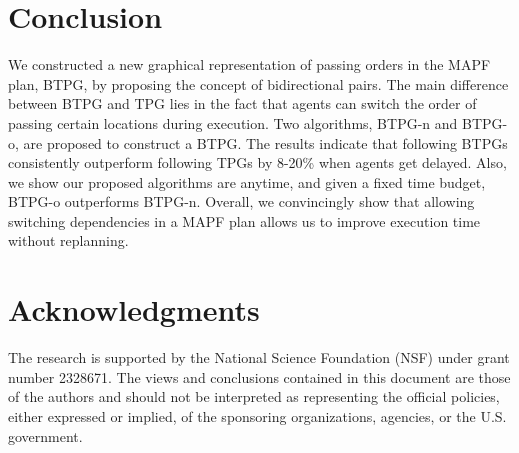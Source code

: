 \documentclass[letterpaper]{article} %
\theoremstyle{definition}
\begin{document}


\section{Conclusion}
We constructed a new graphical representation of passing orders in the MAPF plan, BTPG, by proposing the concept of bidirectional pairs. The main difference between BTPG and TPG lies in the fact that agents can switch the order of passing certain locations during execution. Two algorithms, BTPG-n and BTPG-o, are proposed to construct a BTPG. The results indicate that following BTPGs consistently outperform following TPGs by 8-20\% when agents get delayed. Also, we show our proposed algorithms are anytime, and given a fixed time budget, BTPG-o outperforms BTPG-n. Overall, we convincingly show that allowing switching dependencies in a MAPF plan allows us to improve execution time without replanning.

\section*{Acknowledgments}
The research is supported by the National Science Foundation (NSF) under grant number 2328671. The views and conclusions contained in this document are those of the authors and should not be interpreted as representing the official policies, either expressed or implied, of the sponsoring organizations, agencies, or the U.S. government.
\end{document}
